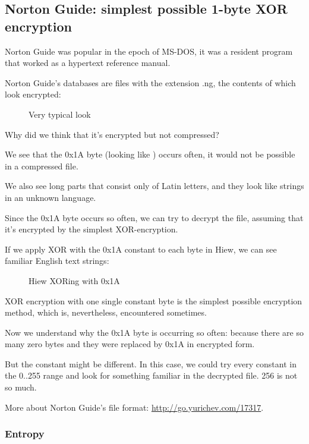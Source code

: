 \clearpage
\subsection{Norton Guide: simplest possible 1-byte XOR encryption}
\label{norton_guide}

Norton Guide was popular in the epoch of MS-DOS, it was a resident program that worked as a hypertext reference manual.

Norton Guide's databases are files with the extension .ng, the contents of which look encrypted:

\begin{figure}[H]
\centering
{}
\caption{Very typical look}
\end{figure}

Why did we think that it's encrypted but not compressed?

We see that the 0x1A byte (looking like \q{$\rightarrow$}) occurs often, it would not be possible in a compressed file.

We also see long parts that consist only of Latin letters, and they look like strings in an unknown
language.

\clearpage
Since the 0x1A byte occurs so often, we can try to decrypt the file, assuming that it's encrypted
by the simplest XOR-encryption.

If we apply XOR with the 0x1A constant to each byte in Hiew, we can see familiar English text strings:

\begin{figure}[H]
\centering
{}
\caption{Hiew XORing with 0x1A}
\end{figure}

XOR encryption with one single constant byte is the simplest possible encryption method, which is, nevertheless,
encountered sometimes.

Now we understand why the 0x1A byte is occurring so often: because there are so many zero bytes and they
were replaced by 0x1A in encrypted form.

But the constant might be different.
In this case, we could try every constant in the 0..255 range and look for something familiar in the decrypted
file. 256 is not so much.

More about Norton Guide's file format: \url{http://go.yurichev.com/17317}.

\subsubsection{Entropy}

